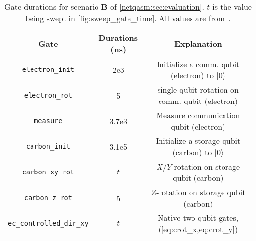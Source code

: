 \begin{table}
  \centering
  \begin{tabular}{|c|c|c|}
    \hline
    Gate                      & Durations (ns) & Explanation                                                \\
    \hline\hline
    \texttt{electron\_init}        & 2e3            & Initialize a comm. qubit (electron) to $|0\rangle$ \\
    \texttt{electron\_rot}         & 5              & single-qubit rotation on comm. qubit (electron)    \\
    \texttt{measure}              & 3.7e3          & Measure communication qubit (electron)                     \\
    \texttt{carbon\_init}          & 3.1e5          & Initialize a storage qubit (carbon) to $|0\rangle$         \\
    \texttt{carbon\_xy\_rot}        & $t$            & $X$/$Y$-rotation on storage qubit (carbon)                 \\
    \texttt{carbon\_z\_rot}         & 5              & $Z$-rotation on storage qubit (carbon)                     \\
    \texttt{ec\_controlled\_dir\_xy} & $t$            & Native two-qubit gates, (\cref{eq:crot_x,eq:crot_y})     \\
    \hline
  \end{tabular}
  \caption{
    Gate durations for scenario \textbf{B} of \cref{netqasm:sec:evaluation}.
    $t$ is the value being swept in \cref{fig:sweep_gate_time}.
    All values are from~\cite{dahlberg2019linklayer}.}
  \label{tab:gates}
\end{table}

